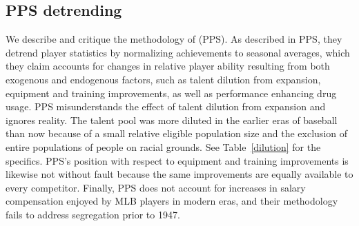 \documentclass[11pt]{article}\usepackage[]{graphicx}\usepackage[]{color}
\begin{document}


\subsection{PPS detrending}

We describe and critique the methodology of \citet{petersen} (PPS). 
As described in PPS, they detrend player statistics by normalizing 
achievements to seasonal averages, which they claim accounts for changes in 
relative player ability resulting from both exogenous and endogenous factors, 
such as 
talent dilution from expansion, 
equipment and training improvements, 
as well as performance enhancing drug usage. 
PPS misunderstands the effect of talent dilution from expansion and ignores 
reality.  The talent pool was more diluted in the earlier eras of 
baseball than now because of a small relative eligible population size and 
the exclusion of entire populations of people on racial grounds.  
See Table~\ref{dilution} for the specifics.  PPS's position with respect 
to equipment and training improvements is likewise not without fault 
because the same improvements are equally available to every competitor.  
Finally, PPS does not account for increases in salary compensation enjoyed by 
MLB players in modern eras, and their methodology fails to address 
segregation prior to 1947.
\end{document}
